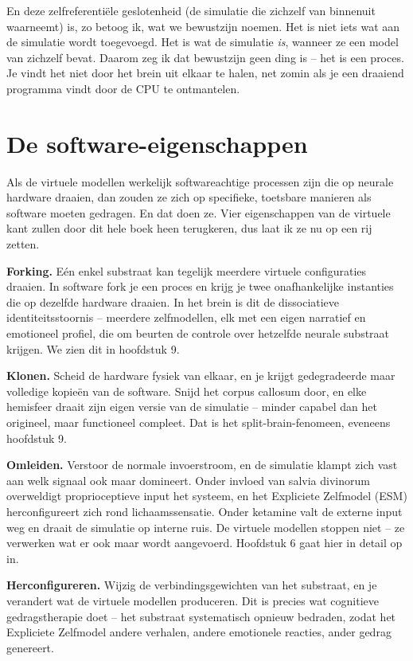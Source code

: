 \documentclass[11pt, twoside, openright]{book}
\begin{document}
En deze zelfreferentiële geslotenheid (de simulatie die zichzelf van binnenuit waarneemt) is, zo betoog ik, wat we bewustzijn noemen. Het is niet iets wat aan de simulatie wordt toegevoegd. Het is wat de simulatie \textit{is}, wanneer ze een model van zichzelf bevat. Daarom zeg ik dat bewustzijn geen ding is -- het is een proces. Je vindt het niet door het brein uit elkaar te halen, net zomin als je een draaiend programma vindt door de CPU te ontmantelen.

\section*{De software-eigenschappen}

Als de virtuele modellen werkelijk softwareachtige processen zijn die op neurale hardware draaien, dan zouden ze zich op specifieke, toetsbare manieren als software moeten gedragen. En dat doen ze. Vier eigenschappen van de virtuele kant zullen door dit hele boek heen terugkeren, dus laat ik ze nu op een rij zetten.

\textbf{Forking.} Eén enkel substraat kan tegelijk meerdere virtuele configuraties draaien. In software fork je een proces en krijg je twee onafhankelijke instanties die op dezelfde hardware draaien. In het brein is dit de dissociatieve identiteitsstoornis -- meerdere zelfmodellen, elk met een eigen narratief en emotioneel profiel, die om beurten de controle over hetzelfde neurale substraat krijgen. We zien dit in hoofdstuk 9.

\textbf{Klonen.} Scheid de hardware fysiek van elkaar, en je krijgt gedegradeerde maar volledige kopieën van de software. Snijd het corpus callosum door, en elke hemisfeer draait zijn eigen versie van de simulatie -- minder capabel dan het origineel, maar functioneel compleet. Dat is het split-brain-fenomeen, eveneens hoofdstuk 9.

\textbf{Omleiden.} Verstoor de normale invoerstroom, en de simulatie klampt zich vast aan welk signaal ook maar domineert. Onder invloed van salvia divinorum overweldigt proprioceptieve input het systeem, en het Expliciete Zelfmodel (ESM) herconfigureert zich rond lichaamssensatie. Onder ketamine valt de externe input weg en draait de simulatie op interne ruis. De virtuele modellen stoppen niet -- ze verwerken wat er ook maar wordt aangevoerd. Hoofdstuk 6 gaat hier in detail op in.

\textbf{Herconfigureren.} Wijzig de verbindingsgewichten van het substraat, en je verandert wat de virtuele modellen produceren. Dit is precies wat cognitieve gedragstherapie doet -- het substraat systematisch opnieuw bedraden, zodat het Expliciete Zelfmodel andere verhalen, andere emotionele reacties, ander gedrag genereert.
\end{document}
